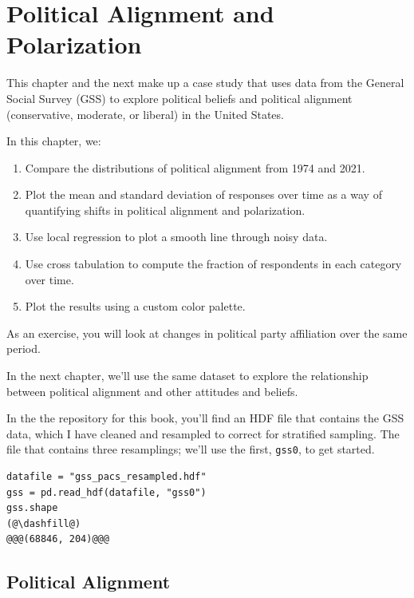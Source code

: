 \hypertarget{political-alignment-and-polarization}{%
\chapter{Political Alignment and
Polarization}\label{political-alignment-and-polarization}}

This chapter and the next make up a case study that uses data from the
General Social Survey (GSS) to explore political beliefs and political
alignment (conservative, moderate, or liberal) in the United States.

In this chapter, we:

\begin{enumerate}
\def\labelenumi{\arabic{enumi}.}
\item
  Compare the distributions of political alignment from 1974 and 2021.
\item
  Plot the mean and standard deviation of responses over time as a way
  of quantifying shifts in political alignment and polarization.
\item
  Use local regression to plot a smooth line through noisy data.
\item
  Use cross tabulation to compute the fraction of respondents in each
  category over time.
\item
  Plot the results using a custom color palette.
\end{enumerate}

As an exercise, you will look at changes in political party affiliation
over the same period.

In the next chapter, we'll use the same dataset to explore the
relationship between political alignment and other attitudes and
beliefs.

In the the repository for this book, you'll find an HDF file that
contains the GSS data, which I have cleaned and resampled to correct for
stratified sampling. The file that contains three resamplings; we'll use
the first, \passthrough{\lstinline!gss0!}, to get started.

\begin{lstlisting}[]
datafile = "gss_pacs_resampled.hdf"
gss = pd.read_hdf(datafile, "gss0")
gss.shape
(@\dashfill@)
@@@(68846, 204)@@@
\end{lstlisting}

\hypertarget{political-alignment}{%
\section{Political Alignment}\label{political-alignment}}

